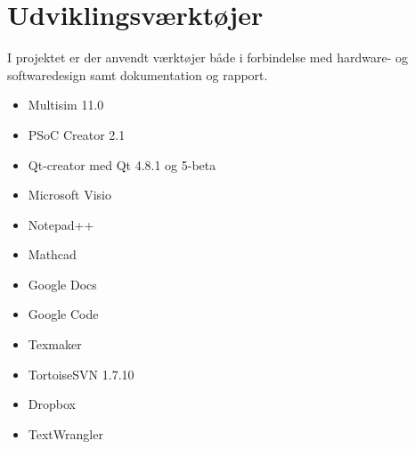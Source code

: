 \section{Udviklingsværktøjer}
I projektet er der anvendt værktøjer både i forbindelse med hardware- og softwaredesign samt dokumentation og rapport.
\begin{itemize}
\item Multisim 11.0
\item PSoC Creator 2.1
\item Qt-creator med Qt 4.8.1 og 5-beta
\item Microsoft Visio
\item Notepad++
\item Mathcad
\item Google Docs
\item Google Code
\item Texmaker
\item TortoiseSVN 1.7.10
\item Dropbox
\item TextWrangler
\end{itemize}
